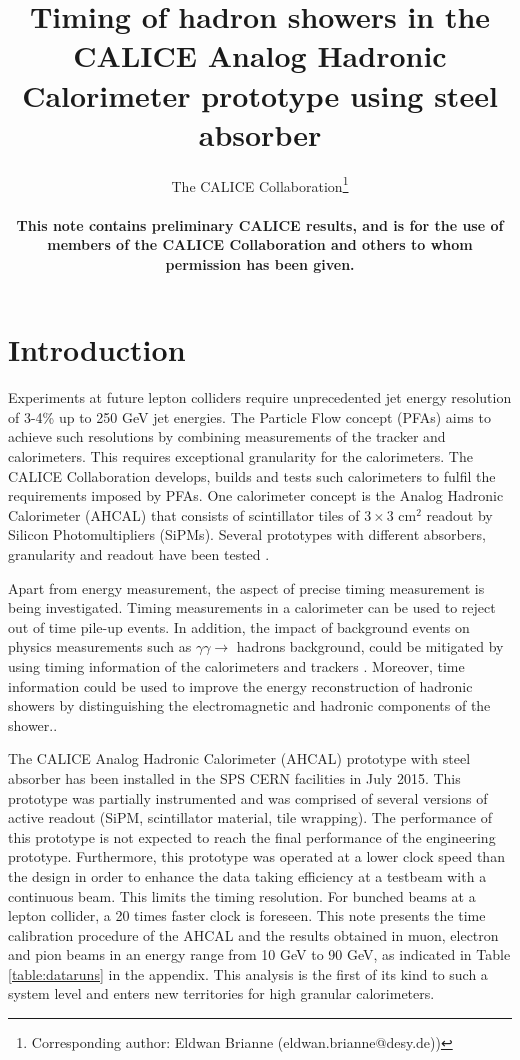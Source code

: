 \documentclass{JINST}
\title{Timing of hadron showers in the CALICE Analog Hadronic Calorimeter prototype using steel absorber}
\author{The CALICE Collaboration\thanks{Corresponding author: Eldwan Brianne (eldwan.brianne@desy.de)) } \\
\vspace{10 mm}

{\rm \bf \normalsize This note contains preliminary CALICE results, and is for the use of members of the CALICE Collaboration and others to whom permission has been given.}
}
\begin{document}
\section{Introduction}

Experiments at future lepton colliders require unprecedented jet energy resolution of 3-4\% up to 250 GeV jet energies. The Particle Flow concept (PFAs) \cite{Thomson:2009rp} aims to achieve such resolutions by combining measurements of the tracker and calorimeters. This requires exceptional granularity for the calorimeters. The CALICE Collaboration develops, builds and tests such calorimeters to fulfil the requirements imposed by PFAs. One calorimeter concept is the Analog Hadronic Calorimeter (AHCAL) that consists of scintillator tiles of $3\times3$ cm$^2$ readout by Silicon Photomultipliers (SiPMs). Several prototypes with different absorbers, granularity and readout have been tested \cite{Sefkow:316196, Krueger:205287}.

Apart from energy measurement, the aspect of precise timing measurement is being investigated. Timing measurements in a calorimeter can be used to reject out of time pile-up events. In addition, the impact of background events on physics measurements such as $\gamma\gamma \rightarrow$ hadrons background, could be mitigated by using timing information of the calorimeters and trackers \cite{Barklow:2016tza}. Moreover, time information could be used to improve the energy reconstruction of hadronic showers by distinguishing the electromagnetic and hadronic components of the shower.\cite{Benaglia2016}.

The CALICE Analog Hadronic Calorimeter (AHCAL) prototype with steel absorber has been installed in the SPS CERN facilities in July 2015. This prototype was partially instrumented and was comprised of several versions of active readout (SiPM, scintillator material, tile wrapping). The performance of this prototype is not expected to reach the final performance of the engineering prototype. Furthermore, this prototype was operated at a lower clock speed than the design in order to enhance the data taking efficiency at a testbeam with a continuous beam. This limits the timing resolution. For bunched beams at a lepton collider, a 20 times faster clock is foreseen. This note presents the time calibration procedure of the AHCAL and the results obtained in muon, electron and pion beams in an energy range from 10 GeV to 90 GeV, as indicated in Table \ref{table:dataruns} in the appendix. This analysis is the first of its kind to such a system level and enters new territories for high granular calorimeters.
\end{document}
